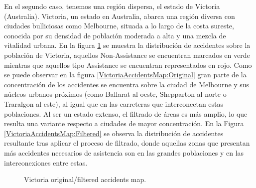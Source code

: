 \documentclass{uathesis-es}
\begin{document}
En el segundo caso, tenemos una región dispersa, el estado de Victoria (Australia). Victoria, un estado en Australia, abarca una región diversa con ciudades bulliciosas como Melbourne, situada a lo largo de la costa sureste, conocida por su densidad de población moderada a alta y una mezcla de vitalidad urbana. En la figura \ref{VictoriaAccidentsMap} se muestra la distribución de accidentes sobre la población de Victoria, aquellos Non-Assistance se encuentran marcados en verde mientras que aquellos tipo Assistance se encuentran representados en rojo. Como se puede observar en la figura \ref{VictoriaAccidentsMap:Original} gran parte de la concentración de los accidentes se encuentra sobre la ciudad de Melbourne y sus núcleos urbanos próximos (como Ballarat al oeste, Shepparton al norte o Traralgon al este), al igual que en las carreteras que interconectan estas poblaciones. Al ser un estado extenso, el filtrado de áreas es más amplio, lo que resulta una variante respecto a ciudades de mayor concentración. En la Figura \ref{VictoriaAccidentsMap:Filtered} se observa la distribución de accidentes resultante tras aplicar el proceso de filtrado, donde aquellas zonas que presentan más accidentes necesarios de asistencia son en las grandes poblaciones y en las interconexiones entre estas.


 \begin{figure}[H]
     \centering
     \caption{Victoria original/filtered accidents map.}
     \label{VictoriaAccidentsMap}
 \end{figure}
\end{document}
